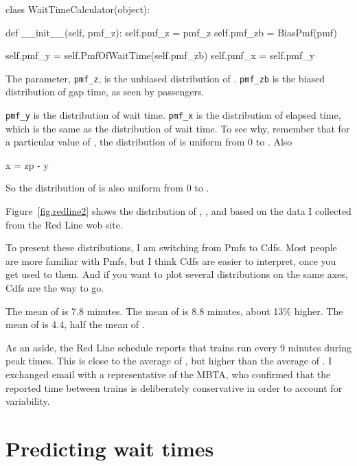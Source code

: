 \documentclass[12pt]{book}
\theoremstyle{exercise}
\begin{document}
\begin{code}
class WaitTimeCalculator(object):

    def __init__(self, pmf_z):
        self.pmf_z = pmf_z
        self.pmf_zb = BiasPmf(pmf)

        self.pmf_y = self.PmfOfWaitTime(self.pmf_zb)
        self.pmf_x = self.pmf_y
\end{code}

The parameter, \verb"pmf_z", is the unbiased distribution of .
\verb"pmf_zb" is the biased distribution of gap time, as seen by
passengers.

\verb"pmf_y" is the distribution of wait time.  \verb"pmf_x" is the
distribution of elapsed time, which is the same as the distribution of
wait time.  To see why, remember that for a particular value of
, the distribution of  is uniform from 0 to .
Also
%
\begin{code}
x = zp - y
\end{code}
%
So the distribution of  is also uniform from 0 to .

Figure~\ref{fig.redline2} shows the distribution of , ,
and  based on the data I collected from the Red Line web site.

To present these distributions, I am switching from Pmfs to Cdfs.
Most people are more familiar with Pmfs, but I think Cdfs are easier
to interpret, once you get used to them.  And if you want to plot
several distributions on the same axes, Cdfs are the way to go.

The mean of  is 7.8 minutes.  The mean of  is 8.8
minutes, about 13\% higher.  The mean of  is 4.4, half
the mean of .

As an aside, the Red Line schedule reports that trains run every
9 minutes during peak times.  This is close to the average of
, but higher than the average of .  I exchanged email
with a representative of the MBTA, who confirmed that the reported
time between trains is deliberately conservative in order to
account for variability.


\section{Predicting wait times}
\label{elapsed}
\end{document}
